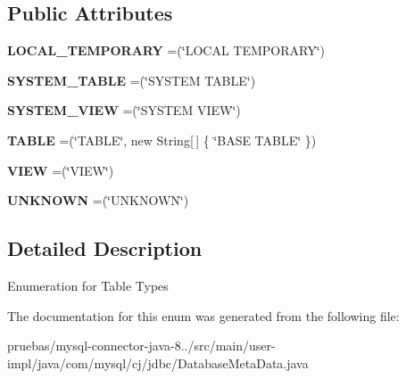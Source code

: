 \subsection*{Public Attributes}
\begin{DoxyCompactItemize}
\item 
\mbox{\label{enumcom_1_1mysql_1_1cj_1_1jdbc_1_1_database_meta_data_1_1_table_type_ae6c597797c0bf59751f836b45127c822}} 
{\bfseries L\+O\+C\+A\+L\+\_\+\+T\+E\+M\+P\+O\+R\+A\+RY} =(\char`\"{}L\+O\+C\+AL T\+E\+M\+P\+O\+R\+A\+RY\char`\"{})
\item 
\mbox{\label{enumcom_1_1mysql_1_1cj_1_1jdbc_1_1_database_meta_data_1_1_table_type_a1f4c2a5aa3f1e1f16e2054ba9a08aa7b}} 
{\bfseries S\+Y\+S\+T\+E\+M\+\_\+\+T\+A\+B\+LE} =(\char`\"{}S\+Y\+S\+T\+EM T\+A\+B\+LE\char`\"{})
\item 
\mbox{\label{enumcom_1_1mysql_1_1cj_1_1jdbc_1_1_database_meta_data_1_1_table_type_a3e21473428f5961bb605bcf2d980d142}} 
{\bfseries S\+Y\+S\+T\+E\+M\+\_\+\+V\+I\+EW} =(\char`\"{}S\+Y\+S\+T\+EM V\+I\+EW\char`\"{})
\item 
\mbox{\label{enumcom_1_1mysql_1_1cj_1_1jdbc_1_1_database_meta_data_1_1_table_type_ad2d8ff1f0ba8faf5b6cfa1b89b18a00b}} 
{\bfseries T\+A\+B\+LE} =(\char`\"{}T\+A\+B\+LE\char`\"{}, new String\mbox{[}$\,$\mbox{]} \{ \char`\"{}B\+A\+SE T\+A\+B\+LE\char`\"{} \})
\item 
\mbox{\label{enumcom_1_1mysql_1_1cj_1_1jdbc_1_1_database_meta_data_1_1_table_type_a07a3b8c5fd1c16cdd2e28be65aed0f0d}} 
{\bfseries V\+I\+EW} =(\char`\"{}V\+I\+EW\char`\"{})
\item 
\mbox{\label{enumcom_1_1mysql_1_1cj_1_1jdbc_1_1_database_meta_data_1_1_table_type_a2f0137826f74b0ecdd5b99db06912a91}} 
{\bfseries U\+N\+K\+N\+O\+WN} =(\char`\"{}U\+N\+K\+N\+O\+WN\char`\"{})
\end{DoxyCompactItemize}


\subsection{Detailed Description}
Enumeration for Table Types 

The documentation for this enum was generated from the following file\+:\begin{DoxyCompactItemize}
\item 
pruebas/mysql-\/connector-\/java-\/8../src/main/user-\/impl/java/com/mysql/cj/jdbc/Database\+Meta\+Data.\+java\end{DoxyCompactItemize}
